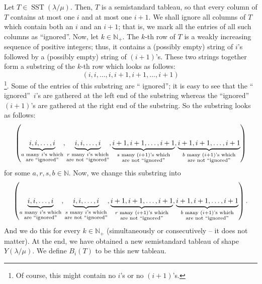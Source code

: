 \documentclass[numbers=enddot,12pt,final,onecolumn,notitlepage]{scrartcl}%
\theoremstyle{definition}
\begin{document}
Let $T\in\operatorname*{SST}\left(  \lambda/\mu\right)  $. Then, $T$ is a
semistandard tableau, so that every column of $T$ contains at most one $i$ and
at most one $i+1$. We shall ignore all columns of $T$ which contain both an
$i$ and an $i+1$; that is, we mark all the entries of all such columns as
\textquotedblleft ignored\textquotedblright. Now, let $k\in\mathbb{N}_{+}$.
The $k$-th row of $T$ is a weakly increasing sequence of positive integers;
thus, it contains a (possibly empty) string of $i$'s followed by a (possibly
empty) string of $\left(  i+1\right)  $'s. These two strings together form a
substring of the $k$-th row which looks as follows:%
\[
\left(  i,i,\ldots,i,i+1,i+1,\ldots,i+1\right)
\]
\footnote{Of course, this might contain no $i$'s or no $\left(  i+1\right)
$'s.}. Some of the entries of this substring are \textquotedblleft
ignored\textquotedblright; it is easy to see that the \textquotedblleft
ignored\textquotedblright\ $i$'s are gathered at the left end of the substring
whereas the \textquotedblleft ignored\textquotedblright\ $\left(  i+1\right)
$'s are gathered at the right end of the substring. So the substring looks
as follows:
\[
\left(  \underbrace{i,i,\ldots,i}_{\substack{a\text{ many }i\text{'s
which}\\\text{are \textquotedblleft ignored\textquotedblright}}%
},\underbrace{i,i,\ldots,i}_{\substack{r\text{ many }i\text{'s which}%
\\\text{are not \textquotedblleft ignored\textquotedblright}}%
},\underbrace{i+1,i+1,\ldots,i+1}_{\substack{s\text{ many }\left(  i+1\right)
\text{'s which}\\\text{are not \textquotedblleft ignored\textquotedblright}%
}},\underbrace{i+1,i+1,\ldots,i+1}_{\substack{b\text{ many }\left(
i+1\right)  \text{'s which}\\\text{are not \textquotedblleft
ignored\textquotedblright}}}\right)
\]
for some $a,r,s,b\in\mathbb{N}$. Now, we change this substring into%
\[
\left(  \underbrace{i,i,\ldots,i}_{\substack{a\text{ many }i\text{'s
which}\\\text{are \textquotedblleft ignored\textquotedblright}}%
},\underbrace{i,i,\ldots,i}_{\substack{s\text{ many }i\text{'s which}%
\\\text{are not \textquotedblleft ignored\textquotedblright}}%
},\underbrace{i+1,i+1,\ldots,i+1}_{\substack{r\text{ many }\left(  i+1\right)
\text{'s which}\\\text{are not \textquotedblleft ignored\textquotedblright}%
}},\underbrace{i+1,i+1,\ldots,i+1}_{\substack{b\text{ many }\left(
i+1\right)  \text{'s which}\\\text{are not \textquotedblleft
ignored\textquotedblright}}}\right)  .
\]
And we do this for every $k\in\mathbb{N}_{+}$ (simultaneously or consecutively
-- it does not matter). At the end, we have obtained a new semistandard
tableau of shape $Y\left(  \lambda/\mu\right)  $. We define $B_{i}\left(
T\right)  $ to be this new tableau.
\end{document}
